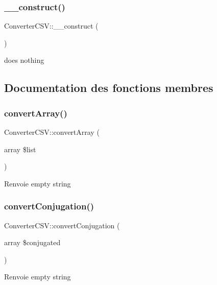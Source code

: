 \subsubsection{\texorpdfstring{\+\_\+\+\_\+construct()}{\_\_construct()}}
{\footnotesize\ttfamily Converter\+C\+S\+V\+::\+\_\+\+\_\+construct (\begin{DoxyParamCaption}{ }\end{DoxyParamCaption})}

does nothing 

\subsection{Documentation des fonctions membres}
\hypertarget{classConverterCSV_a5bf7f48e54520210eeebdc2eb8f9e222}{}\label{classConverterCSV_a5bf7f48e54520210eeebdc2eb8f9e222} 
\subsubsection{\texorpdfstring{convert\+Array()}{convertArray()}}
{\footnotesize\ttfamily Converter\+C\+S\+V\+::convert\+Array (\begin{DoxyParamCaption}\item[{array}]{\$list }\end{DoxyParamCaption})}

\begin{DoxyReturn}{Renvoie}
empty string 
\end{DoxyReturn}
\hypertarget{classConverterCSV_aff168b6953b8c9bdf43280c70e9c7170}{}\label{classConverterCSV_aff168b6953b8c9bdf43280c70e9c7170} 
\subsubsection{\texorpdfstring{convert\+Conjugation()}{convertConjugation()}}
{\footnotesize\ttfamily Converter\+C\+S\+V\+::convert\+Conjugation (\begin{DoxyParamCaption}\item[{array}]{\$conjugated }\end{DoxyParamCaption})}

\begin{DoxyReturn}{Renvoie}
empty string 
\end{DoxyReturn}
\hypertarget{classConverterCSV_a66253359624a5be3a4f5df9761b980a7}{}\label{classConverterCSV_a66253359624a5be3a4f5df9761b980a7} 
